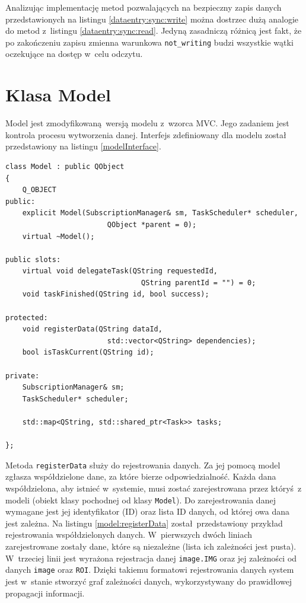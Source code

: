 Analizując implementację metod pozwalających na bezpieczny zapis danych przedstawionych na listingu \ref{dataentry:sync:write} można dostrzec dużą analogie do metod z~listingu \ref{dataentry:sync:read}. Jedyną zasadniczą różnicą jest fakt, że po zakończeniu zapisu zmienna warunkowa \lstinline$not_writing$ budzi wszystkie wątki oczekujące na dostęp w~celu odczytu.

\section{Klasa Model}

Model jest zmodyfikowaną wersją modelu z~wzorca MVC. Jego zadaniem jest kontrola procesu wytworzenia danej. Interfejs zdefiniowany dla modelu został przedstawiony na listingu \ref{modelInterface}.

\begin{minipage}{\textwidth}
	\begin{lstlisting}[label=modelInterface, caption={Interfejs klasy \lstinline$Model$},alsoletter={()[].=}]
class Model : public QObject
{
	Q_OBJECT
public:
	explicit Model(SubscriptionManager& sm, TaskScheduler* scheduler,
						QObject *parent = 0);
	virtual ~Model();

public slots:
	virtual void delegateTask(QString requestedId,
								QString parentId = "") = 0;
	void taskFinished(QString id, bool success);

protected:
	void registerData(QString dataId,
						std::vector<QString> dependencies);
	bool isTaskCurrent(QString id);

private:
	SubscriptionManager& sm;
	TaskScheduler* scheduler;
	
	std::map<QString, std::shared_ptr<Task>> tasks;

};
	\end{lstlisting}
\end{minipage}


Metoda \lstinline$registerData$ służy do rejestrowania danych. Za jej pomocą model zgłasza współdzielone dane, za które bierze odpowiedzialność. Każda dana współdzielona, aby istnieć w~systemie, musi zostać zarejestrowana przez któryś z modeli (obiekt klasy pochodnej od klasy \lstinline$Model$). Do zarejestrowania danej wymagane jest jej identyfikator (ID) oraz lista ID danych, od której owa dana jest zależna. Na listingu \ref{model:registerData} został przedstawiony przykład rejestrowania współdzielonych danych. W~pierwszych dwóch liniach zarejestrowane zostały dane, które są niezależne (lista ich zależności jest pusta). W~trzeciej linii jest wyrażona rejestracja danej \lstinline$image.IMG$ oraz jej zależności od danych \lstinline$image$ oraz \lstinline$ROI$. Dzięki takiemu formatowi rejestrowania danych system jest w~stanie stworzyć graf zależności danych, wykorzystywany do prawidłowej propagacji informacji.

